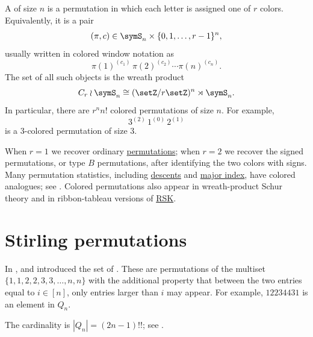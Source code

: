 A  of size $n$ is a permutation in which each
letter is assigned one of $r$ colors.  Equivalently, it is a pair
\[
  (\pi,c) \in \symS_n \times \{0,1,\dotsc,r-1\}^n,
\]
usually written in colored window notation as
\[
  \pi(1)^{(c_1)}\,\pi(2)^{(c_2)}\dotsm \pi(n)^{(c_n)}.
\]
The set of all such objects is the wreath product
\[
  C_r \wr \symS_n \cong (\setZ/r\setZ)^n \rtimes \symS_n.
\]
In particular, there are $r^n n!$ colored permutations of size $n$.
For example,
\[
  3^{(2)}\,1^{(0)}\,2^{(1)}
\]
is a $3$-colored permutation of size $3$.

When $r=1$ we recover ordinary \hyperref[notationPermutations]{permutations};
when $r=2$ we recover the signed permutations, or type $B$ permutations, after
identifying the two colors with signs.  Many permutation statistics, including
\hyperref[descentSet]{descents} and \hyperref[majorIndex]{major index}, have
colored analogues; see
\cite{GarsiaGessel1979,Hyatt2012}.  Colored permutations also appear in
wreath-product Schur theory and in ribbon-tableau versions of
\hyperref[rsk]{RSK}.


\section[permutationsStirling]{Stirling permutations}

In \cite{GesselStanley1978},  and
introduced the set of .
These are permutations of the multiset $\{1,1,2,2,3,3,\dotsc,n,n\}$ with the
additional property that between the two entries equal to $i \in [n]$, only
entries larger than $i$ may appear.
For example, $12234431$ is an element in $Q_n$.

The cardinality is $|Q_n|=(2n-1)!!$; see .
